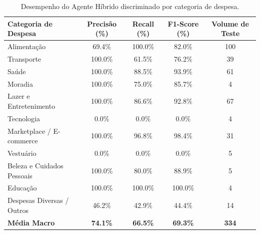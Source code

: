 \begin{table}[htb]
	\centering
	\caption{Desempenho do Agente Híbrido discriminado por categoria de despesa.}
	\label{tab:resultados_categorias}
	\begin{tabularx}{\textwidth}{X c c c c}
		\toprule
		\textbf{Categoria de Despesa} & \textbf{Precisão (\%)} & \textbf{Recall (\%)} & \textbf{F1-Score (\%)} & \textbf{Volume de Teste} \\
		\midrule
		Alimentação & 69.4\% & 100.0\% & 82.0\% & 100 \\
		Transporte & 100.0\% & 61.5\% & 76.2\% & 39 \\
		Saúde & 100.0\% & 88.5\% & 93.9\% & 61 \\
		Moradia & 100.0\% & 75.0\% & 85.7\% & 4 \\
		Lazer e Entretenimento & 100.0\% & 86.6\% & 92.8\% & 67 \\
		Tecnologia & 0.0\% & 0.0\% & 0.0\% & 4 \\
		Marketplace / E-commerce & 100.0\% & 96.8\% & 98.4\% & 31 \\
		Vestuário & 0.0\% & 0.0\% & 0.0\% & 5 \\
		Beleza e Cuidados Pessoais & 100.0\% & 80.0\% & 88.9\% & 5 \\
		Educação & 100.0\% & 100.0\% & 100.0\% & 4 \\
		Despesas Diversas / Outros & 46.2\% & 42.9\% & 44.4\% & 14 \\
		\midrule
		\textbf{Média Macro} & \textbf{74.1\%} & \textbf{66.5\%} & \textbf{69.3\%} & \textbf{334} \\
		\bottomrule
	\end{tabularx}
\end{table}

